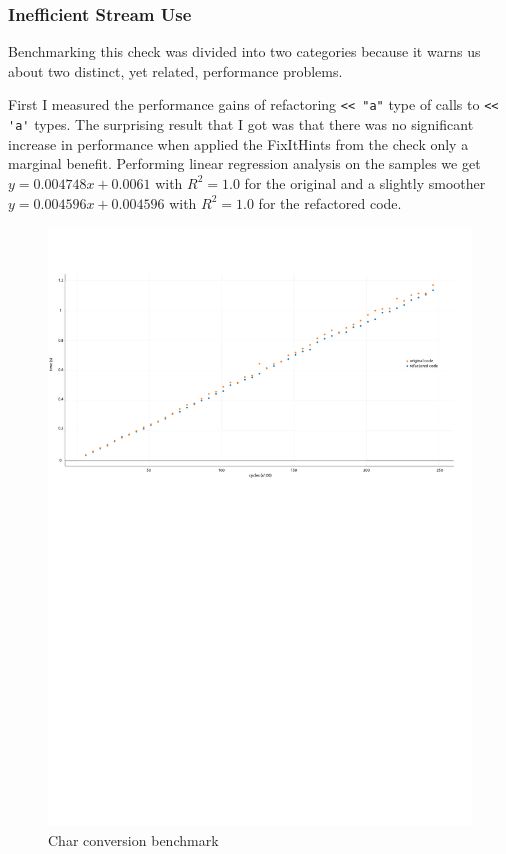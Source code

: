 \subsubsection{Inefficient Stream Use}
\par Benchmarking this check was divided into two categories because it warns us about two distinct, yet related, performance problems. \medskip
\par First I measured the performance gains of refactoring \verb|<< "a"| type of calls to \verb|<< 'a'| types. The surprising result that I got was that there was no significant increase in performance when applied the FixItHints from the check only a marginal benefit. Performing linear regression analysis on the samples we get $y=0.004748x+0.0061$ with $R^2=1.0$ for the original and a slightly smoother $y=0.004596x+0.004596$ with $R^2=1.0$ for the refactored code.
\begin{figure}[H]
	\caption{Char conversion benchmark}
	\includegraphics[scale=0.7]{images/stream_char_performance.pdf}
\end{figure}
